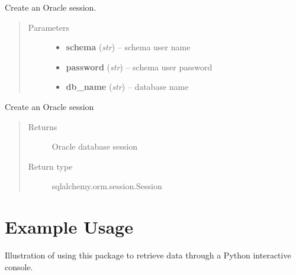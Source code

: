 \documentclass[letterpaper,10pt,english]{sphinxmanual}
\begin{document}
\begin{fulllineitems}
\label{modules:webb_utils.db_utils.AlchemDB}
Create an Oracle session.
\begin{quote}\begin{description}
\item[{Parameters}] \leavevmode\begin{itemize}
\item {} 
\textbf{schema} (\emph{str}) -- schema user name

\item {} 
\textbf{password} (\emph{str}) -- schema user password

\item {} 
\textbf{db\_name} (\emph{str}) -- database name

\end{itemize}

\end{description}\end{quote}

\begin{fulllineitems}
\label{modules:webb_utils.db_utils.AlchemDB.create_session}
Create an Oracle session
\begin{quote}\begin{description}
\item[{Returns}] \leavevmode
Oracle database session

\item[{Return type}] \leavevmode
sqlalchemy.orm.session.Session

\end{description}\end{quote}

\end{fulllineitems}


\end{fulllineitems}



\chapter{Example Usage}
\label{example_usage:example-usage}\label{example_usage::doc}
Illustration of using this package to retrieve data through
a Python interactive console.
\end{document}
